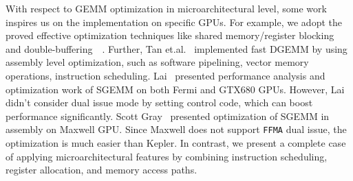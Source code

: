 With respect to GEMM optimization in microarchitectural level, some work inspires us on the implementation 
on specific GPUs. For example, we adopt the proved effective optimization techniques like shared memory/register 
blocking and double-buffering~\cite{volkov}~\cite{tan}. Further, Tan et.al.~\cite{tan} implemented fast DGEMM by using 
assembly level optimization, such as software pipelining, vector memory operations, instruction scheduling. 
Lai~\cite{lai} presented performance analysis and optimization work of SGEMM on both Fermi and GTX680 GPUs. However, 
Lai didn't consider dual issue mode by setting control code, which can boost performance significantly. Scott 
Gray~\cite{nervana_sgemm_wiki} presented optimization of SGEMM in assembly on Maxwell GPU. Since Maxwell does not 
support {\tt FFMA} dual issue, the optimization is much easier than
Kepler. In contrast, we present a complete case of applying microarchitectural features by combining instruction 
scheduling, register allocation, and memory access paths. 
